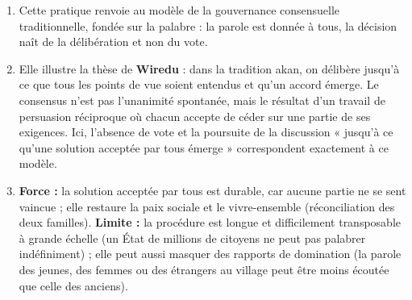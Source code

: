 \documentclass[11pt]{article}
\newcommand{\cle}[1]{{\popxbold\color{popdark}#1}}
\begin{document}
\begin{corrige}
\begin{enumerate}
\item Cette pratique renvoie au modèle de la \cle{gouvernance consensuelle} traditionnelle, fondée sur la palabre : la parole est donnée à tous, la décision naît de la délibération et non du vote.
\item Elle illustre la thèse de \textbf{Wiredu} : dans la tradition akan, on délibère jusqu'à ce que tous les points de vue soient entendus et qu'un accord émerge. Le consensus n'est pas l'unanimité spontanée, mais le résultat d'un travail de persuasion réciproque où chacun accepte de céder sur une partie de ses exigences. Ici, l'absence de vote et la poursuite de la discussion « jusqu'à ce qu'une solution acceptée par tous émerge » correspondent exactement à ce modèle.
\item \textbf{Force :} la solution acceptée par tous est durable, car aucune partie ne se sent vaincue ; elle restaure la paix sociale et le vivre-ensemble (réconciliation des deux familles). \textbf{Limite :} la procédure est longue et difficilement transposable à grande échelle (un État de millions de citoyens ne peut pas palabrer indéfiniment) ; elle peut aussi masquer des rapports de domination (la parole des jeunes, des femmes ou des étrangers au village peut être moins écoutée que celle des anciens).
\end{enumerate}
\end{corrige}
\end{document}
